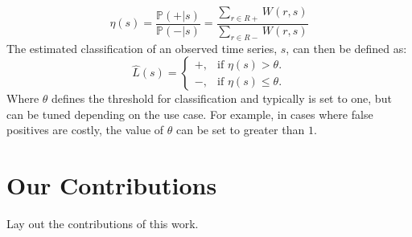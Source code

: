 \begin{equation}
\eta(s)=\frac{\mathbb{P}(+|s)}{\mathbb{P}{(-|s)}} =\frac{\sum_{r \in R+} W(r,s)}{\sum_{r \in R-}W(r,s)}
\end{equation}
The estimated classification of an observed time series, $s$, can then be defined as:
\begin{equation}
  \hat{L}(s)=\begin{cases}
    +, & \text{if $\eta(s)>\theta$}.\\
    -, & \text{if $\eta(s) \leq \theta$}.
  \end{cases}
\end{equation}
Where $\theta$ defines the threshold for classification and typically is set to one, but can be tuned depending on the use case. For example, in cases where false positives are costly, the value of $\theta$ can be set to greater than $1$. 

\section{Our Contributions}
Lay out the contributions of this work.